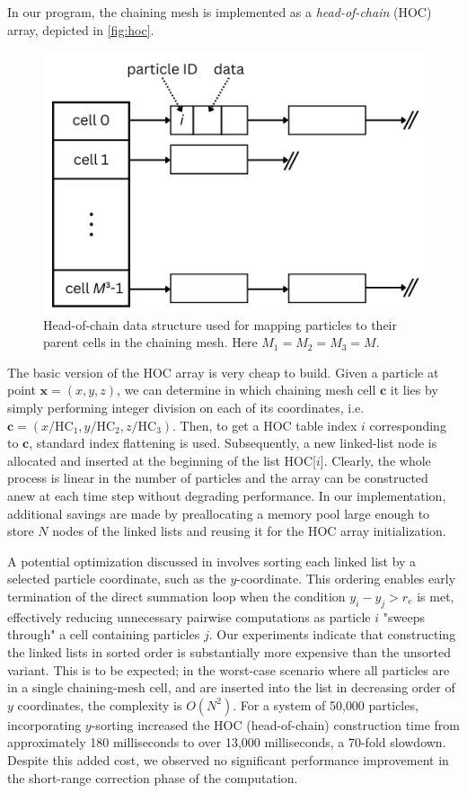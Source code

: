 In our program, the chaining mesh is implemented as a \textit{head-of-chain} (HOC) array, depicted in \autoref{fig:hoc}.
\begin{figure}[htp]
    \centering
    \includegraphics[scale=0.25]{chapters/p3m-method/img/hoc.png}
    \caption{Head-of-chain data structure used for mapping particles to their parent cells in the chaining mesh.
        Here $M_1=M_2=M_3 = M$.}
    \label{fig:hoc}
\end{figure}
The basic version of the HOC array is very cheap to build.
Given a particle at point $\mathbf{x} = (x, y, z)$, we can determine in which chaining mesh cell $\mathbf{c}$ it lies by simply performing integer division on each of its coordinates, i.e. $\mathbf{c} = (x / \text{HC}_1, y / \text{HC}_2, z / \text{HC}_3)$.
Then, to get a HOC table index $i$ corresponding to $\mathbf{c}$, standard index flattening is used.
Subsequently, a new linked-list node is allocated and inserted at the beginning of the list HOC[$i$].
Clearly, the whole process is linear in the number of particles and the array can be constructed anew at each time step without degrading performance.
In our implementation, additional savings are made by preallocating a memory pool large enough to store $N$ nodes of the linked lists and reusing it for the HOC array initialization.

A potential optimization discussed in \cite{Hockney1988} involves sorting each linked list by a selected particle coordinate, such as the $y$-coordinate.
This ordering enables early termination of the direct summation loop when the condition $y_i - y_j > r_e$ is met, effectively reducing unnecessary pairwise computations as particle $i$ "sweeps through" a cell containing particles $j$.
Our experiments indicate that constructing the linked lists in sorted order is substantially more expensive than the unsorted variant.
This is to be expected; in the worst-case scenario where all particles are in a single chaining-mesh cell, and are inserted into the list in decreasing order of $y$ coordinates, the complexity is $O(N^2)$.
For a system of 50{,}000 particles, incorporating $y$-sorting increased the HOC (head-of-chain) construction time from approximately 180 milliseconds to over 13{,}000 milliseconds, a 70-fold slowdown.
Despite this added cost, we observed no significant performance improvement in the short-range correction phase of the computation.
